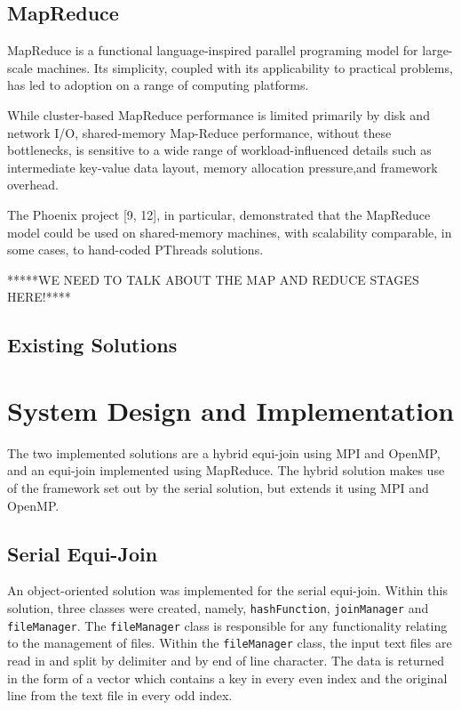 \documentclass[10pt,twocolumn]{witseiepaper}
\begin{document}
\subsection{MapReduce}

MapReduce is a functional language-inspired parallel programing model for large-scale machines. Its simplicity, coupled with its applicability to practical problems, has led to adoption on a range of computing platforms. 

While cluster-based MapReduce performance is limited primarily by disk and network I/O, shared-memory Map-Reduce performance, without these bottlenecks, is sensitive to a wide range of workload-influenced details such as intermediate key-value data layout, memory allocation pressure,and framework overhead.

The Phoenix project [9, 12], in particular, demonstrated that the MapReduce model could be used on shared-memory machines, with scalability comparable, in some cases, to hand-coded PThreads solutions.

*****WE NEED TO TALK ABOUT THE MAP AND REDUCE STAGES HERE!****

\subsection{Existing Solutions}

\section{System Design and Implementation}
The two implemented solutions are a hybrid equi-join using MPI and OpenMP, and an equi-join implemented using MapReduce. The hybrid solution makes use of the framework set out by the serial solution, but extends it using MPI and OpenMP.

\subsection{Serial Equi-Join}
An object-oriented solution was implemented for the serial equi-join. Within this solution, three classes were created, namely, \texttt{hashFunction}, \texttt{joinManager} and \texttt{fileManager}. The \texttt{fileManager} class is responsible for any functionality relating to the management of files. Within the \texttt{fileManager} class, the input text files are read in and split by delimiter and by end of line character. The data is returned in the form of a vector which contains a key in every even index and the original line from the text file in every odd index.
\end{document}
